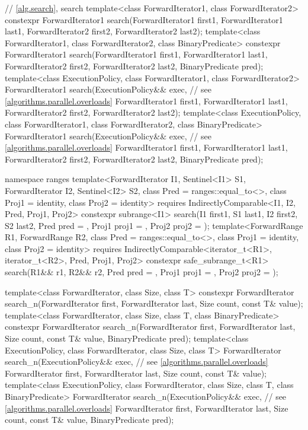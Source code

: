 \begin{codeblock}
{  // \ref{alg.search}, search
  template<class ForwardIterator1, class ForwardIterator2>
    constexpr ForwardIterator1
      search(ForwardIterator1 first1, ForwardIterator1 last1,
             ForwardIterator2 first2, ForwardIterator2 last2);
  template<class ForwardIterator1, class ForwardIterator2, class BinaryPredicate>
    constexpr ForwardIterator1
      search(ForwardIterator1 first1, ForwardIterator1 last1,
             ForwardIterator2 first2, ForwardIterator2 last2,
             BinaryPredicate pred);
  template<class ExecutionPolicy, class ForwardIterator1, class ForwardIterator2>
    ForwardIterator1
      search(ExecutionPolicy&& exec, // see \ref{algorithms.parallel.overloads}
             ForwardIterator1 first1, ForwardIterator1 last1,
             ForwardIterator2 first2, ForwardIterator2 last2);
  template<class ExecutionPolicy, class ForwardIterator1, class ForwardIterator2,
           class BinaryPredicate>
    ForwardIterator1
      search(ExecutionPolicy&& exec, // see \ref{algorithms.parallel.overloads}
             ForwardIterator1 first1, ForwardIterator1 last1,
             ForwardIterator2 first2, ForwardIterator2 last2,
             BinaryPredicate pred);

  namespace ranges {
    template<ForwardIterator I1, Sentinel<I1> S1, ForwardIterator I2,
        Sentinel<I2> S2, class Pred = ranges::equal_to<>,
        class Proj1 = identity, class Proj2 = identity>
      requires IndirectlyComparable<I1, I2, Pred, Proj1, Proj2>
      constexpr subrange<I1>
        search(I1 first1, S1 last1, I2 first2, S2 last2, Pred pred = {},
               Proj1 proj1 = {}, Proj2 proj2 = {});
    template<ForwardRange R1, ForwardRange R2, class Pred = ranges::equal_to<>,
        class Proj1 = identity, class Proj2 = identity>
      requires IndirectlyComparable<iterator_t<R1>, iterator_t<R2>, Pred, Proj1, Proj2>
      constexpr safe_subrange_t<R1>
        search(R1&& r1, R2&& r2, Pred pred = {},
               Proj1 proj1 = {}, Proj2 proj2 = {});
  }

  template<class ForwardIterator, class Size, class T>
    constexpr ForwardIterator
      search_n(ForwardIterator first, ForwardIterator last,
               Size count, const T& value);
  template<class ForwardIterator, class Size, class T, class BinaryPredicate>
    constexpr ForwardIterator
      search_n(ForwardIterator first, ForwardIterator last,
               Size count, const T& value,
               BinaryPredicate pred);
  template<class ExecutionPolicy, class ForwardIterator, class Size, class T>
    ForwardIterator
      search_n(ExecutionPolicy&& exec, // see \ref{algorithms.parallel.overloads}
               ForwardIterator first, ForwardIterator last,
               Size count, const T& value);
  template<class ExecutionPolicy, class ForwardIterator, class Size, class T,
           class BinaryPredicate>
    ForwardIterator
      search_n(ExecutionPolicy&& exec, // see \ref{algorithms.parallel.overloads}
               ForwardIterator first, ForwardIterator last,
               Size count, const T& value,
               BinaryPredicate pred);

}
\end{codeblock}
